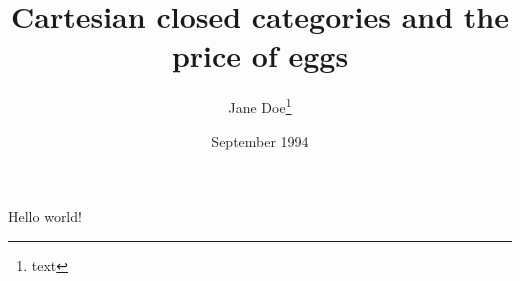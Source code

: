 \documentclass[12pt, letterpaper]{article}
\title{Cartesian closed categories and the price of eggs}
\author{Jane Doe\thanks{text}}
\date{September 1994}
\begin{document}
   \maketitle
   Hello world!
\end{document}

